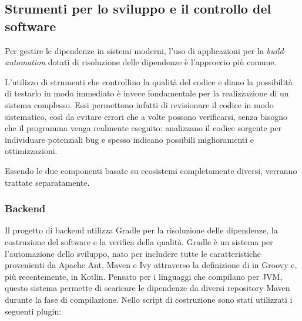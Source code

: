   \subsection{Strumenti per lo sviluppo e il controllo del software}
    Per gestire le dipendenze in sistemi moderni, l'uso di applicazioni per la \emph{build-automation} dotati di risoluzione delle dipendenze è l'approccio più comune.

    L'utilizzo di strumenti che controllino la qualità del codice e diano la possibilità di testarlo in modo immediato è invece fondamentale per la realizzazione di un sistema complesso.
    Essi permettono infatti di revisionare il codice in modo sistematico, così da evitare errori che a volte possono verificarsi, senza bisogno che il programma venga realmente eseguito:
    analizzano il codice sorgente per individuare potenziali bug e spesso indicano possibili miglioramenti e ottimizzazioni.

    Essendo le due componenti basate su ecosistemi completamente diversi, verranno trattate separatamente.

    \subsubsection{Backend}

      Il progetto di backend utilizza Gradle per la risoluzione delle dipendenze, la costruzione del software e la verifica della qualità.
      Gradle è un sistema per l'automazione dello sviluppo, nato per includere tutte le caratteristiche provenienti da Apache Ant, Maven e Ivy attraverso la definizione di  in Groovy e, più recentemente, in Kotlin.
      Pensato per i linguaggi che compilano per JVM, questo sistema permette di scaricare le dipendenze da diversi repository Maven durante la fase di compilazione.
      Nello script di costruzione sono stati utilizzati i seguenti plugin:

